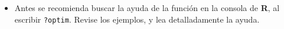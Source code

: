 \documentclass[12pt,letterpaper,]{book}
\providecommand{\tightlist}{%
  \setlength{\itemsep}{0pt}\setlength{\parskip}{0pt}}
\begin{document}
\begin{itemize}
\tightlist
\item
  Antes se recomienda buscar la ayuda de la función en la consola de
  \textbf{R}, al escribir \texttt{?optim}. Revise los ejemplos, y lea
  detalladamente la ayuda.
\end{itemize}


\end{document}
